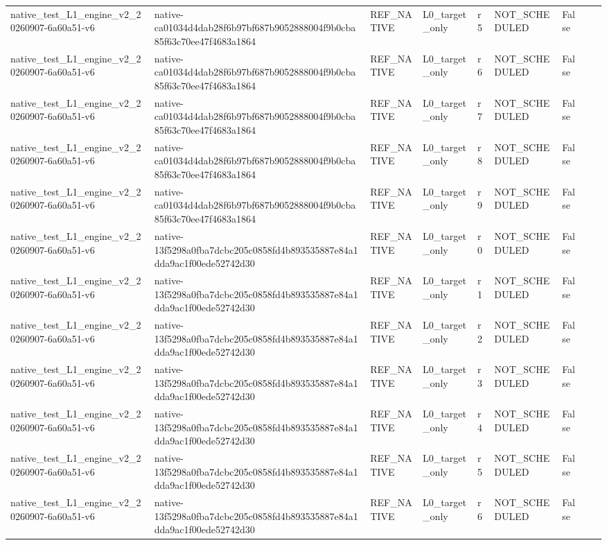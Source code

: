 \begin{tabular}{lllllllll}
native\_test\_L1\_engine\_v2\_20260907-6a60a51-v6 & native-ca01034d4dab28f6b97bf687b9052888004f9b0cba85f63c70ee47f4683a1864 & REF\_NATIVE & L0\_target\_only & r5 & NOT\_SCHEDULED & False &  &  \\
native\_test\_L1\_engine\_v2\_20260907-6a60a51-v6 & native-ca01034d4dab28f6b97bf687b9052888004f9b0cba85f63c70ee47f4683a1864 & REF\_NATIVE & L0\_target\_only & r6 & NOT\_SCHEDULED & False &  &  \\
native\_test\_L1\_engine\_v2\_20260907-6a60a51-v6 & native-ca01034d4dab28f6b97bf687b9052888004f9b0cba85f63c70ee47f4683a1864 & REF\_NATIVE & L0\_target\_only & r7 & NOT\_SCHEDULED & False &  &  \\
native\_test\_L1\_engine\_v2\_20260907-6a60a51-v6 & native-ca01034d4dab28f6b97bf687b9052888004f9b0cba85f63c70ee47f4683a1864 & REF\_NATIVE & L0\_target\_only & r8 & NOT\_SCHEDULED & False &  &  \\
native\_test\_L1\_engine\_v2\_20260907-6a60a51-v6 & native-ca01034d4dab28f6b97bf687b9052888004f9b0cba85f63c70ee47f4683a1864 & REF\_NATIVE & L0\_target\_only & r9 & NOT\_SCHEDULED & False &  &  \\
native\_test\_L1\_engine\_v2\_20260907-6a60a51-v6 & native-13f5298a0fba7dcbc205c0858fd4b893535887e84a1dda9ac1f00ede52742d30 & REF\_NATIVE & L0\_target\_only & r0 & NOT\_SCHEDULED & False &  &  \\
native\_test\_L1\_engine\_v2\_20260907-6a60a51-v6 & native-13f5298a0fba7dcbc205c0858fd4b893535887e84a1dda9ac1f00ede52742d30 & REF\_NATIVE & L0\_target\_only & r1 & NOT\_SCHEDULED & False &  &  \\
native\_test\_L1\_engine\_v2\_20260907-6a60a51-v6 & native-13f5298a0fba7dcbc205c0858fd4b893535887e84a1dda9ac1f00ede52742d30 & REF\_NATIVE & L0\_target\_only & r2 & NOT\_SCHEDULED & False &  &  \\
native\_test\_L1\_engine\_v2\_20260907-6a60a51-v6 & native-13f5298a0fba7dcbc205c0858fd4b893535887e84a1dda9ac1f00ede52742d30 & REF\_NATIVE & L0\_target\_only & r3 & NOT\_SCHEDULED & False &  &  \\
native\_test\_L1\_engine\_v2\_20260907-6a60a51-v6 & native-13f5298a0fba7dcbc205c0858fd4b893535887e84a1dda9ac1f00ede52742d30 & REF\_NATIVE & L0\_target\_only & r4 & NOT\_SCHEDULED & False &  &  \\
native\_test\_L1\_engine\_v2\_20260907-6a60a51-v6 & native-13f5298a0fba7dcbc205c0858fd4b893535887e84a1dda9ac1f00ede52742d30 & REF\_NATIVE & L0\_target\_only & r5 & NOT\_SCHEDULED & False &  &  \\
native\_test\_L1\_engine\_v2\_20260907-6a60a51-v6 & native-13f5298a0fba7dcbc205c0858fd4b893535887e84a1dda9ac1f00ede52742d30 & REF\_NATIVE & L0\_target\_only & r6 & NOT\_SCHEDULED & False &  &  \\

\end{tabular}
